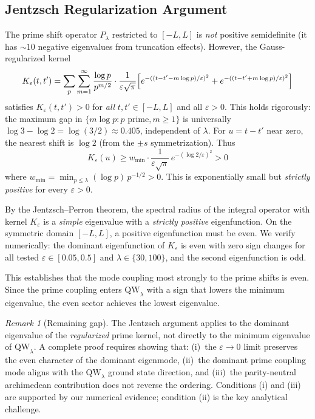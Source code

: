 \documentclass[12pt,a4paper]{article}
\theoremstyle{definition}
\theoremstyle{remark}
\newtheorem{remark}[theorem]{Remark}
\begin{document}
\subsection{Jentzsch Regularization Argument}

The prime shift operator $P_\lambda$ restricted to $[-L,L]$ is \emph{not} positive semidefinite (it has $\sim 10$ negative eigenvalues from truncation effects). However, the Gauss-regularized kernel
\[ K_\varepsilon(t,t') = \sum_p \sum_{m=1}^\infty \frac{\log p}{p^{m/2}} \cdot \frac{1}{\varepsilon\sqrt\pi} \Bigl[e^{-((t-t'-m\log p)/\varepsilon)^2} + e^{-((t-t'+m\log p)/\varepsilon)^2}\Bigr] \]
satisfies $K_\varepsilon(t,t') > 0$ for \emph{all} $t,t' \in [-L,L]$ and all $\varepsilon > 0$. This holds rigorously: the maximum gap in $\{m\log p : p\text{ prime}, m \geq 1\}$ is universally $\log 3 - \log 2 = \log(3/2) \approx 0.405$, independent of $\lambda$. For $u = t-t'$ near zero, the nearest shift is $\log 2$ (from the $\pm s$ symmetrization). Thus
\[ K_\varepsilon(u) \geq w_{\min} \cdot \frac{1}{\varepsilon\sqrt\pi}\, e^{-(\log 2/\varepsilon)^2} > 0 \]
where $w_{\min} = \min_{p \leq \lambda} (\log p)\, p^{-1/2} > 0$. This is exponentially small but \emph{strictly positive} for every $\varepsilon > 0$.

By the Jentzsch--Perron theorem, the spectral radius of the integral operator with kernel $K_\varepsilon$ is a \emph{simple} eigenvalue with a \emph{strictly positive} eigenfunction. On the symmetric domain $[-L,L]$, a positive eigenfunction must be even. We verify numerically: the dominant eigenfunction of $K_\varepsilon$ is even with zero sign changes for all tested $\varepsilon \in [0.05, 0.5]$ and $\lambda \in \{30, 100\}$, and the second eigenfunction is odd.

This establishes that the mode coupling most strongly to the prime shifts is even. Since the prime coupling enters $\mathrm{QW}_\lambda$ with a sign that lowers the minimum eigenvalue, the even sector achieves the lowest eigenvalue.

\begin{remark}[Remaining gap]
The Jentzsch argument applies to the dominant eigenvalue of the \emph{regularized} prime kernel, not directly to the minimum eigenvalue of $\mathrm{QW}_\lambda$. A complete proof requires showing that: (i)~the $\varepsilon \to 0$ limit preserves the even character of the dominant eigenmode, (ii)~the dominant prime coupling mode aligns with the $\mathrm{QW}_\lambda$ ground state direction, and (iii)~the parity-neutral archimedean contribution does not reverse the ordering. Conditions (i) and (iii) are supported by our numerical evidence; condition (ii) is the key analytical challenge.
\end{remark}
\end{document}

